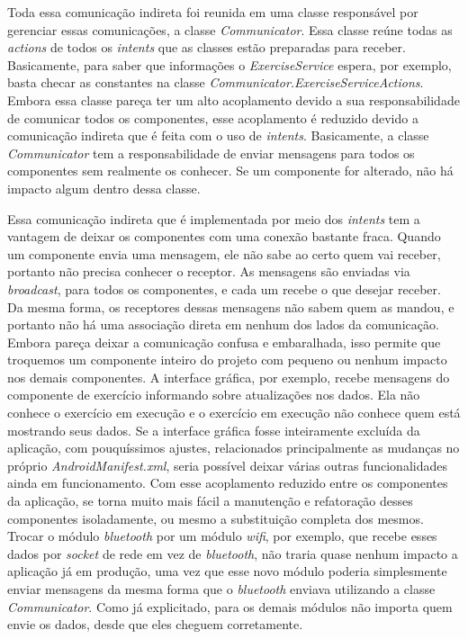Toda essa comunicação indireta foi reunida em uma classe responsável por gerenciar essas comunicações, a classe \textit{Communicator}. Essa classe reúne todas as \textit{actions} de todos os \textit{intents} que as classes estão preparadas para receber. Basicamente, para saber que informações o \textit{ExerciseService} espera, por exemplo, basta checar as constantes na classe \textit{Communicator.ExerciseServiceActions}. Embora essa classe pareça ter um alto acoplamento devido a sua responsabilidade de comunicar todos os componentes, esse acoplamento é reduzido devido a comunicação indireta que é feita com o uso de \textit{intents}. Basicamente, a classe \textit{Communicator} tem a responsabilidade de enviar mensagens para todos os componentes sem realmente os conhecer. Se um componente for alterado, não há impacto algum dentro dessa classe.

Essa comunicação indireta que é implementada por meio dos \textit{intents} tem a vantagem de deixar os componentes com uma conexão bastante fraca. Quando um componente envia uma mensagem, ele não sabe ao certo quem vai receber, portanto não precisa conhecer o receptor. As mensagens são enviadas via \textit{broadcast}, para todos os componentes, e cada um recebe o que desejar receber. Da mesma forma, os receptores dessas mensagens não sabem quem as mandou, e portanto não há uma associação direta em nenhum dos lados da comunicação. Embora pareça deixar a comunicação confusa e embaralhada, isso permite que troquemos um componente inteiro do projeto com pequeno ou nenhum impacto nos demais componentes. A interface gráfica, por exemplo, recebe mensagens do componente de exercício informando sobre atualizações nos dados. Ela não conhece o exercício em execução e o exercício em execução não conhece quem está mostrando seus dados. Se a interface gráfica fosse inteiramente excluída da aplicação, com pouquíssimos ajustes, relacionados principalmente as mudanças no próprio \textit{AndroidManifest.xml}, seria possível deixar várias outras funcionalidades ainda em funcionamento. Com esse acoplamento reduzido entre os componentes da aplicação, se torna muito mais fácil a manutenção e refatoração desses componentes isoladamente, ou mesmo a substituição completa dos mesmos. Trocar o módulo \textit{bluetooth} por um módulo \textit{wifi}, por exemplo, que recebe esses dados por \textit{socket} de rede em vez de \textit{bluetooth}, não traria quase nenhum impacto a aplicação já em produção, uma vez que esse novo módulo poderia simplesmente enviar mensagens da mesma forma que o \textit{bluetooth} enviava utilizando a classe \textit{Communicator}. Como já explicitado, para os demais módulos não importa quem envie os dados, desde que eles cheguem corretamente. 

